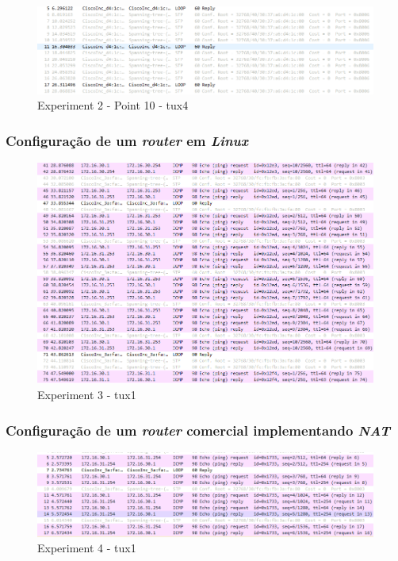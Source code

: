 \documentclass[a4paper]{article}
\begin{document}
	\begin{figure}[H]
	\begin{center}
  	\includegraphics[width=\linewidth]{exp2_10_tux4.png}
  	\caption{Experiment 2 - Point 10 - tux4}
  	\label{fig:Experiment 2 - Point 10 - tux4}
	\end{center}
	\end{figure}

	\subsubsection{Configuração de um \textit{router} em \textit{Linux}}

	\begin{figure}[H]
	\begin{center}
  	\includegraphics[width=\linewidth]{exp3_tux1.png}
  	\caption{Experiment 3 - tux1}
  	\label{fig:Experiment 3 - tux1}
	\end{center}
	\end{figure}

	\subsubsection{Configuração de um \textit{router} comercial implementando \textit{NAT}}

	\begin{figure}[H]
	\begin{center}
  	\includegraphics[width=\linewidth]{exp4_tux1.png}
  	\caption{Experiment 4 - tux1}
  	\label{fig:Experiment 4 - tux1}
	\end{center}
	\end{figure}
\end{document}
